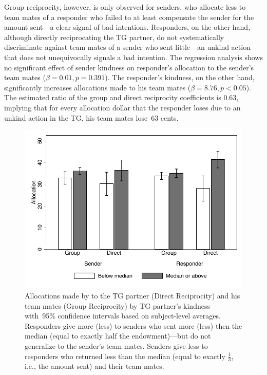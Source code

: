 \documentclass[12pt,a4paper]{article}
\def\figwidth{\textwidth}
\begin{document}
Group reciprocity, however, is only observed for senders, who allocate less to team mates of a responder who failed to at least compensate the sender for the amount sent---a clear signal of bad intentions. Responders, on the other hand, although directly reciprocating the TG partner, do not systematically discriminate against team mates of a sender who sent little---an unkind action that does not unequivocally signals a bad intention.
The regression analysis shows no significant effect of sender kindness on responder's allocation to the sender's team mates ($\beta = 0.01, p=0.391$). The responder's kindness, on the other hand, significantly increases allocations made to his team mates ($\beta = 8.76, p<0.05$). The estimated ratio of the group and direct reciprocity coefficients is 0.63, implying that for every allocation dollar that the responder loses due to an unkind action in the TG, his team mates lose~63 cents.


\begin{figure}
\caption{
Allocations made by to the TG partner (Direct Reciprocity) and his team mates (Group Reciprocity) by TG partner's kindness with~95\% confidence intervals based on subject-level averages. Responders give more (less) to senders who sent more (less) then the median (equal to exactly half the endowment)---but do not generalize to the sender's team mates. Senders give less to responders who returned less than the median (equal to exactly $\frac{1}{3}$, i.e., the amount sent) and their team mates.
}
\label{fig:reciprocity}
\begin{center}	\includegraphics[width=\figwidth]{Reciprocity.pdf}
\end{center}
\end{figure}
\end{document}
